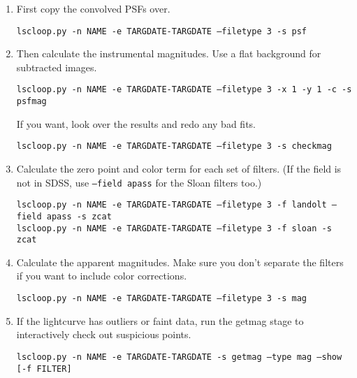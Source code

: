 \begin{enumerate}

\item First copy the convolved PSFs over.

{\tt lscloop.py -n NAME -e TARGDATE-TARGDATE --filetype 3 -s psf}

\item Then calculate the instrumental magnitudes. Use a flat background for subtracted images.

{\tt lscloop.py -n NAME -e TARGDATE-TARGDATE --filetype 3 -x 1 -y 1 -c -s psfmag }

If you want, look over the results and redo any bad fits.

{\tt lscloop.py -n NAME -e TARGDATE-TARGDATE --filetype 3 -s checkmag}

\item Calculate the zero point and color term for each set of filters. (If the field is not in SDSS, use {\tt --field apass} for the Sloan filters too.)

{\tt lscloop.py -n NAME -e TARGDATE-TARGDATE --filetype 3 -f landolt --field apass -s zcat }\\
{\tt lscloop.py -n NAME -e TARGDATE-TARGDATE --filetype 3 -f sloan -s zcat }

\item Calculate the apparent magnitudes. Make sure you don't separate the filters if you want to include color corrections.

{\tt lscloop.py -n NAME -e TARGDATE-TARGDATE --filetype 3 -s mag }

\item If the lightcurve has outliers or faint data, run the getmag stage to interactively check out suspicious points.

{\tt lscloop.py -n NAME -e TARGDATE-TARGDATE -s getmag --type mag --show [-f FILTER]}

\end{enumerate}